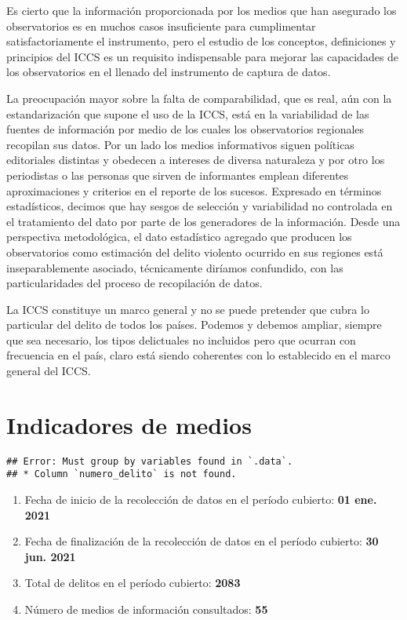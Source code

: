 \documentclass[
]{book}
\providecommand{\tightlist}{%
  \setlength{\itemsep}{0pt}\setlength{\parskip}{0pt}}
\begin{document}
Es cierto que la información proporcionada por los medios que han asegurado los observatorios es en muchos casos insuficiente para cumplimentar satisfactoriamente el instrumento, pero el estudio de los conceptos, definiciones y principios del ICCS es un requisito indispensable para mejorar las capacidades de los observatorios en el llenado del instrumento de captura de datos.

La preocupación mayor sobre la falta de comparabilidad, que es real, aún con la estandarización que supone el uso de la ICCS, está en la variabilidad de las fuentes de información por medio de los cuales los observatorios regionales recopilan sus datos. Por un lado los medios informativos siguen políticas editoriales distintas y obedecen a intereses de diversa naturaleza y por otro los periodistas o las personas que sirven de informantes emplean diferentes aproximaciones y criterios en el reporte de los sucesos. Expresado en términos estadísticos, decimos que hay sesgos de selección y variabilidad no controlada en el tratamiento del dato por parte de los generadores de la información. Desde una perspectiva metodológica, el dato estadístico agregado que producen los observatorios como estimación del delito violento ocurrido en sus regiones está inseparablemente asociado, técnicamente diríamos confundido, con las particularidades del proceso de recopilación de datos.

La ICCS constituye un marco general y no se puede pretender que cubra lo particular del delito de todos los países. Podemos y debemos ampliar, siempre que sea necesario, los tipos delictuales no incluidos pero que ocurran con frecuencia en el país, claro está siendo coherentes con lo establecido en el marco general del ICCS.

\hypertarget{indicadores-de-medios}{%
\chapter{Indicadores de medios}\label{indicadores-de-medios}}

\begin{verbatim}
## Error: Must group by variables found in `.data`.
## * Column `numero_delito` is not found.
\end{verbatim}

\begin{enumerate}
\def\labelenumi{\alph{enumi}.}
\tightlist
\item
  Fecha de inicio de la recolección de datos en el período cubierto: \textbf{01 ene. 2021}
\item
  Fecha de finalización de la recolección de datos en el período cubierto: \textbf{30 jun. 2021}
\item
  Total de delitos en el período cubierto: \textbf{2083}
\item
  Número de medios de información consultados: \textbf{55}
\end{enumerate}
\end{document}
